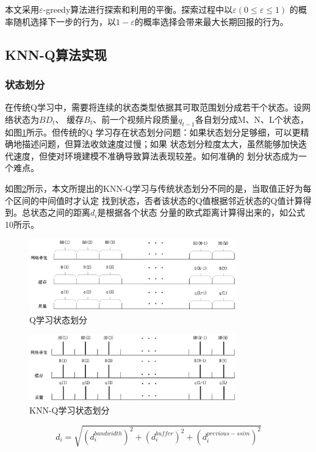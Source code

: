 \documentclass[twocolumn]{article}
\begin{document}
本文采用$\varepsilon$-greedy算法进行探索和利用的平衡。探索过程中以$\varepsilon(0\leq\varepsilon\leq1)$
的概率随机选择下一步的行为，以$1-\varepsilon$的概率选择会带来最大长期回报的行为。
\subsection{KNN-Q算法实现}
\subsubsection{状态划分}
在传统Q学习中，需要将连续的状态类型依据其可取范围划分成若干个状态。设网络状态为$BD_{t}$、
缓存$B_{t}$、前一个视频片段质量$q_{t-1}$各自划分成M、N、L个状态，如图\ref{q-learning state}所示。但传统的Q
学习存在状态划分问题：如果状态划分足够细，可以更精确地描述问题，但算法收敛速度过慢；如果
状态划分粒度太大，虽然能够加快迭代速度，但使对环境建模不准确导致算法表现较差。如何准确的
划分状态成为一个难点。

如图\ref{knn-q-learning state}所示，本文所提出的KNN-Q学习与传统状态划分不同的是，当取值正好为每个区间的中间值时才认定
找到状态，否者该状态的Q值根据邻近状态的Q值计算得到。总状态之间的距离$d_{i}$是根据各个状态
分量的欧式距离计算得出来的，如公式10所示。

\begin{figure}[ht]
\centering
\includegraphics[width=0.8\textwidth]{q-state}
\caption{Q学习状态划分}
\label{q-learning state}
\end{figure}
\begin{figure}[ht]
\centering
\includegraphics[width=0.8\textwidth]{knn-q-state}
\caption{KNN-Q学习状态划分}
\label{knn-q-learning state}
\end{figure}
\begin{equation}
d_{i}=\sqrt{(d_{i}^{bandwidth})^2+(d_{i}^{buffer})^2+(d_{i}^{previous-ssim})^2}
\end{equation}
\end{document}
